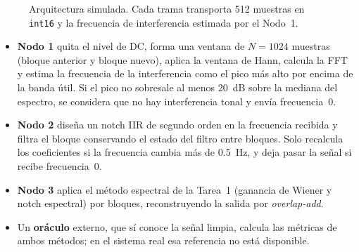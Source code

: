 \documentclass[11pt,a4paper]{article}
\begin{document}
\begin{figure}[h]
  \centering
  \caption{Arquitectura simulada. Cada trama transporta 512 muestras en
  \texttt{int16} y la frecuencia de interferencia estimada por el Nodo~1.}
  \label{fig:arquitectura}
\end{figure}
 
\begin{itemize}
  \item \textbf{Nodo 1} quita el nivel de DC, forma una ventana de $N=1024$
        muestras (bloque anterior y bloque nuevo), aplica la ventana de Hann,
        calcula la FFT y estima la frecuencia de la interferencia como el
        pico más alto por encima de la banda útil. Si el pico no sobresale al
        menos 20~dB sobre la mediana del espectro, se considera que no hay
        interferencia tonal y envía frecuencia~0.
  \item \textbf{Nodo 2} diseña un notch IIR de segundo orden en la frecuencia
        recibida y filtra el bloque conservando el estado del filtro entre
        bloques. Solo recalcula los coeficientes si la frecuencia cambia más
        de 0.5~Hz, y deja pasar la señal si recibe frecuencia~0.
  \item \textbf{Nodo 3} aplica el método espectral de la Tarea~1 (ganancia de
        Wiener y notch espectral) por bloques, reconstruyendo la salida por
        \emph{overlap-add}.
  \item Un \textbf{oráculo} externo, que sí conoce la señal limpia, calcula
        las métricas de ambos métodos; en el sistema real esa referencia no
        está disponible.
\end{itemize}
 
\end{document}
